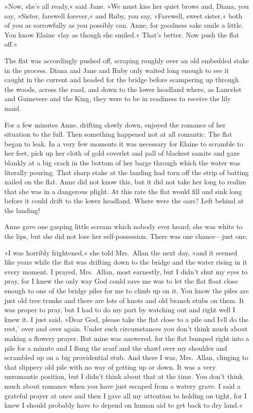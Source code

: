 »Now, she's all ready,« said Jane. »We must kiss her quiet brows and, Diana, you say, »Sister, farewell forever,« and Ruby, you say, »Farewell, sweet sister,« both of you as sorrowfully as you possibly can. Anne, for goodness sake smile a little. You know Elaine »lay as though she smiled.« That's better. Now push the flat off.«

The flat was accordingly pushed off, scraping roughly over an old embedded stake in the process. Diana and Jane and Ruby only waited long enough to see it caught in the current and headed for the bridge before scampering up through the woods, across the road, and down to the lower headland where, as Lancelot and Guinevere and the King, they were to be in readiness to receive the lily maid.

For a few minutes Anne, drifting slowly down, enjoyed the romance of her situation to the full. Then something happened not at all romantic. The flat began to leak. In a very few moments it was necessary for Elaine to scramble to her feet, pick up her cloth of gold coverlet and pall of blackest samite and gaze blankly at a big crack in the bottom of her barge through which the water was literally pouring. That sharp stake at the landing had torn off the strip of batting nailed on the flat. Anne did not know this, but it did not take her long to realize that she was in a dangerous plight. At this rate the flat would fill and sink long before it could drift to the lower headland. Where were the oars? Left behind at the landing!

Anne gave one gasping little scream which nobody ever heard; she was white to the lips, but she did not lose her self-possession. There was one chance—just one.

»I was horribly frightened,« she told Mrs.~Allan the next day, »and it seemed like years while the flat was drifting down to the bridge and the water rising in it every moment. I prayed, Mrs.~Allan, most earnestly, but I didn't shut my eyes to pray, for I knew the only way God could save me was to let the flat float close enough to one of the bridge piles for me to climb up on it. You know the piles are just old tree trunks and there are lots of knots and old branch stubs on them. It was proper to pray, but I had to do my part by watching out and right well I knew it. I just said, »Dear God, please take the flat close to a pile and I«ll do the rest,' over and over again. Under such circumstances you don't think much about making a flowery prayer. But mine was answered, for the flat bumped right into a pile for a minute and I flung the scarf and the shawl over my shoulder and scrambled up on a big providential stub. And there I was, Mrs.~Allan, clinging to that slippery old pile with no way of getting up or down. It was a very unromantic position, but I didn't think about that at the time. You don't think much about romance when you have just escaped from a watery grave. I said a grateful prayer at once and then I gave all my attention to holding on tight, for I knew I should probably have to depend on human aid to get back to dry land.«

